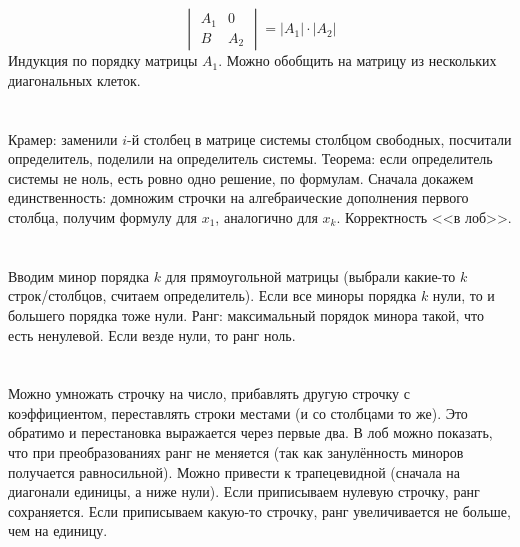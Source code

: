 \section{} %
\[
\begin{vmatrix}
A_1 & 0 \\
B   & A_2
\end{vmatrix}
= |A_1| \cdot |A_2|
\]
Индукция по порядку матрицы $A_1$.
Можно обобщить на матрицу из нескольких диагональных клеток.

\section{} %
Крамер: заменили $i$-й столбец в матрице системы столбцом свободных, посчитали определитель, поделили на определитель системы.
Теорема: если определитель системы не ноль, есть ровно одно решение, по формулам.
Сначала докажем единственность: домножим строчки на алгебраические дополнения первого столбца, получим формулу для $x_1$, аналогично для $x_k$.
Корректность <<в лоб>>.

\section{} %
Вводим минор порядка $k$ для прямоугольной матрицы (выбрали какие-то $k$ строк/столбцов, считаем определитель).
Если все миноры порядка $k$ нули, то и большего порядка тоже нули.
Ранг: максимальный порядок минора такой, что есть ненулевой.
Если везде нули, то ранг ноль.

\section{} %
Можно умножать строчку на число, прибавлять другую строчку с коэффициентом, переставлять строки местами
(и со столбцами то же).
Это обратимо и перестановка выражается через первые два.
В лоб можно показать, что при преобразованиях ранг не меняется (так как занулённость миноров получается равносильной).
Можно привести к трапецевидной (сначала на диагонали единицы, а ниже нули).
Если приписываем нулевую строчку, ранг сохраняется.
Если приписываем какую-то строчку, ранг увеличивается не больше, чем на единицу.

